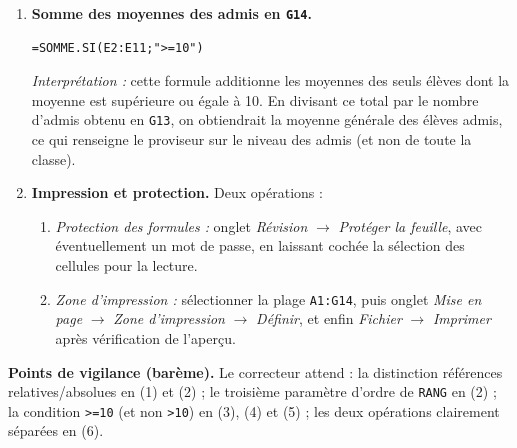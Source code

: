 \documentclass[11pt]{article}
\begin{document}
\begin{corrige}
\begin{enumerate}
\item \textbf{Somme des moyennes des admis en \texttt{G14}.}
\begin{lstlisting}
=SOMME.SI(E2:E11;">=10")
\end{lstlisting}
\emph{Interprétation :} cette formule additionne les moyennes des seuls élèves dont la moyenne est supérieure ou égale à 10. En divisant ce total par le nombre d'admis obtenu en \texttt{G13}, on obtiendrait la moyenne générale des élèves admis, ce qui renseigne le proviseur sur le niveau des admis (et non de toute la classe).

\item \textbf{Impression et protection.} Deux opérations :
\begin{enumerate}
\item \emph{Protection des formules :} onglet \emph{Révision} $\to$ \emph{Protéger la feuille}, avec éventuellement un mot de passe, en laissant cochée la sélection des cellules pour la lecture.
\item \emph{Zone d'impression :} sélectionner la plage \texttt{A1:G14}, puis onglet \emph{Mise en page} $\to$ \emph{Zone d'impression} $\to$ \emph{Définir}, et enfin \emph{Fichier} $\to$ \emph{Imprimer} après vérification de l'aperçu.
\end{enumerate}
\end{enumerate}

\textbf{Points de vigilance (barème).} Le correcteur attend : la distinction références relatives/absolues en (1) et (2) ; le troisième paramètre d'ordre de \texttt{RANG} en (2) ; la condition \texttt{>=10} (et non \texttt{>10}) en (3), (4) et (5) ; les deux opérations clairement séparées en (6).
\end{corrige}
\end{document}

